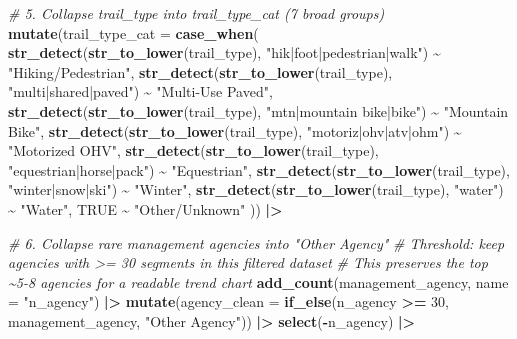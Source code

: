 \documentclass[
]{article}
\newenvironment{Shaded}{\begin{snugshade}}{\end{snugshade}}
\newcommand{\AttributeTok}[1]{\textcolor[rgb]{0.13,0.29,0.53}{#1}}
\newcommand{\CommentTok}[1]{\textcolor[rgb]{0.56,0.35,0.01}{\textit{#1}}}
\newcommand{\ConstantTok}[1]{\textcolor[rgb]{0.56,0.35,0.01}{#1}}
\newcommand{\DecValTok}[1]{\textcolor[rgb]{0.00,0.00,0.81}{#1}}
\newcommand{\FunctionTok}[1]{\textcolor[rgb]{0.13,0.29,0.53}{\textbf{#1}}}
\newcommand{\NormalTok}[1]{#1}
\newcommand{\SpecialCharTok}[1]{\textcolor[rgb]{0.81,0.36,0.00}{\textbf{#1}}}
\newcommand{\StringTok}[1]{\textcolor[rgb]{0.31,0.60,0.02}{#1}}
\begin{document}
\begin{Shaded}
\begin{Highlighting}[]
  \CommentTok{\# 5. Collapse trail\_type into trail\_type\_cat (7 broad groups)}
  \FunctionTok{mutate}\NormalTok{(}\AttributeTok{trail\_type\_cat =} \FunctionTok{case\_when}\NormalTok{(}
    \FunctionTok{str\_detect}\NormalTok{(}\FunctionTok{str\_to\_lower}\NormalTok{(trail\_type), }\StringTok{"hik|foot|pedestrian|walk"}\NormalTok{) }\SpecialCharTok{\textasciitilde{}} \StringTok{"Hiking/Pedestrian"}\NormalTok{,}
    \FunctionTok{str\_detect}\NormalTok{(}\FunctionTok{str\_to\_lower}\NormalTok{(trail\_type), }\StringTok{"multi|shared|paved"}\NormalTok{)       }\SpecialCharTok{\textasciitilde{}} \StringTok{"Multi{-}Use Paved"}\NormalTok{,}
    \FunctionTok{str\_detect}\NormalTok{(}\FunctionTok{str\_to\_lower}\NormalTok{(trail\_type), }\StringTok{"mtn|mountain bike|bike"}\NormalTok{)   }\SpecialCharTok{\textasciitilde{}} \StringTok{"Mountain Bike"}\NormalTok{,}
    \FunctionTok{str\_detect}\NormalTok{(}\FunctionTok{str\_to\_lower}\NormalTok{(trail\_type), }\StringTok{"motoriz|ohv|atv|ohm"}\NormalTok{)      }\SpecialCharTok{\textasciitilde{}} \StringTok{"Motorized OHV"}\NormalTok{,}
    \FunctionTok{str\_detect}\NormalTok{(}\FunctionTok{str\_to\_lower}\NormalTok{(trail\_type), }\StringTok{"equestrian|horse|pack"}\NormalTok{)    }\SpecialCharTok{\textasciitilde{}} \StringTok{"Equestrian"}\NormalTok{,}
    \FunctionTok{str\_detect}\NormalTok{(}\FunctionTok{str\_to\_lower}\NormalTok{(trail\_type), }\StringTok{"winter|snow|ski"}\NormalTok{)          }\SpecialCharTok{\textasciitilde{}} \StringTok{"Winter"}\NormalTok{,}
    \FunctionTok{str\_detect}\NormalTok{(}\FunctionTok{str\_to\_lower}\NormalTok{(trail\_type), }\StringTok{"water"}\NormalTok{)                    }\SpecialCharTok{\textasciitilde{}} \StringTok{"Water"}\NormalTok{,}
    \ConstantTok{TRUE}                                                              \SpecialCharTok{\textasciitilde{}} \StringTok{"Other/Unknown"}
\NormalTok{  )) }\SpecialCharTok{|\textgreater{}}
  
  \CommentTok{\# 6. Collapse rare management agencies into "Other Agency"}
  \CommentTok{\#    Threshold: keep agencies with \textgreater{}= 30 segments in this filtered dataset}
  \CommentTok{\#    This preserves the top \textasciitilde{}5{-}8 agencies for a readable trend chart}
  \FunctionTok{add\_count}\NormalTok{(management\_agency, }\AttributeTok{name =} \StringTok{"n\_agency"}\NormalTok{) }\SpecialCharTok{|\textgreater{}}
  \FunctionTok{mutate}\NormalTok{(}\AttributeTok{agency\_clean =} \FunctionTok{if\_else}\NormalTok{(n\_agency }\SpecialCharTok{\textgreater{}=} \DecValTok{30}\NormalTok{,}
\NormalTok{                                management\_agency,}
                                \StringTok{"Other Agency"}\NormalTok{)) }\SpecialCharTok{|\textgreater{}}
  \FunctionTok{select}\NormalTok{(}\SpecialCharTok{{-}}\NormalTok{n\_agency) }\SpecialCharTok{|\textgreater{}}
  

\end{Highlighting}
\end{Shaded}
\end{document}
